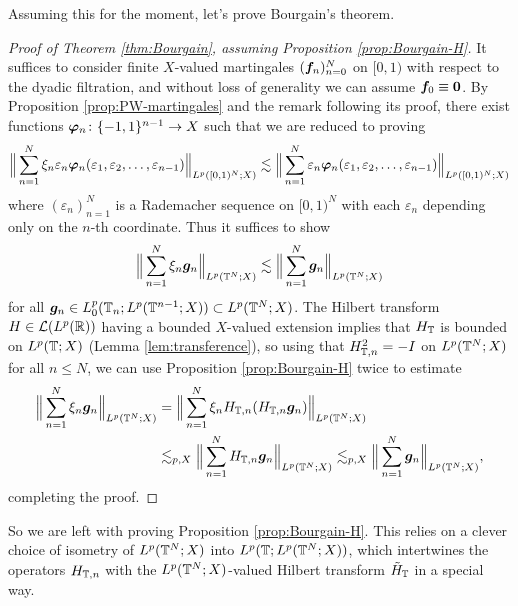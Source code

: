 Assuming this for the moment, let's prove Bourgain's theorem.
\begin{proof}[Proof of Theorem \ref{thm:Bourgain}, assuming Proposition \ref{prop:Bourgain-H}]
  It suffices to consider finite $X$-valued martingales $(\bm{f}_n)_{n=0}^{N}$ on $[0,1)$ with respect to the dyadic filtration, and without loss of generality we can assume $\bm{f}_{0} \equiv \bm{0}$.
  By Proposition \ref{prop:PW-martingales} and the remark following its proof, there exist functions $\bm{\varphi}_{n} \colon \{-1,1\}^{n-1} \rightarrow X$ such that we are reduced to proving
  \begin{equation*}
    \Big\| \sum_{n=1}^{N} \xi_{n} \varepsilon_{n} \bm{\varphi}_{n}(\varepsilon_{1}, \varepsilon_{2}, \ldots, \varepsilon_{n-1}) \Big\|_{L^p([0,1)^{N};X)} \lesssim \Big\| \sum_{n=1}^{N} \varepsilon_{n} \bm{\varphi}_{n}(\varepsilon_{1}, \varepsilon_{2}, \ldots, \varepsilon_{n-1}) \Big\|_{L^p([0,1)^{N};X)}
  \end{equation*}
  where $(\varepsilon_{n})_{n=1}^{N}$ is a Rademacher sequence on $[0,1)^{N}$ with each $\varepsilon_{n}$ depending only on the $n$-th coordinate.
  Thus it suffices to show
  \begin{equation*}
    \Big\| \sum_{n=1}^{N} \xi_{n} \bm{g}_{n} \Big\|_{L^p(\mathbb{T}^{N};X)} \lesssim \Big\| \sum_{n=1}^{N} \bm{g}_{n} \Big\|_{L^p(\mathbb{T}^{N};X)}
  \end{equation*}
  for all $\bm{g}_{n} \in L_{0}^p(\mathbb{T}_{n};L^{p}(\mathbb{T}^{n-1};X)) \subset L^p(\mathbb{T}^{N};X)$.
  The Hilbert transform $H \in \mathcal{L}(L^p(\mathbb{R}))$ having a bounded $X$-valued extension implies that $H_{\mathbb{T}}$ is bounded on $L^p(\mathbb{T};X)$ (Lemma \ref{lem:transference}), so using that $H_{\mathbb{T},n}^{2} = -I$ on $L^p(\mathbb{T}^{N};X)$ for all $n \leq N$, we can use Proposition \ref{prop:Bourgain-H} twice to estimate
  \begin{equation*}
    \begin{aligned}
      \Big\| \sum_{n=1}^{N} \xi_{n} \bm{g}_{n} \Big\|_{L^p(\mathbb{T}^{N};X)}
      &= \Big\| \sum_{n=1}^{N} \xi_{n} H_{\mathbb{T},n} (H_{\mathbb{T},n} \bm{g}_{n}) \Big\|_{L^p(\mathbb{T}^{N};X)} \\
      &\lesssim_{p,X}  \Big\| \sum_{n=1}^{N} H_{\mathbb{T},n} \bm{g}_{n} \Big\|_{L^p(\mathbb{T}^{N};X)} 
      \lesssim_{p,X}  \Big\| \sum_{n=1}^{N} \bm{g}_{n} \Big\|_{L^p(\mathbb{T}^{N};X)},
    \end{aligned}
  \end{equation*}
  completing the proof.
\end{proof}

So we are left with proving Proposition \ref{prop:Bourgain-H}.
This relies on a clever choice of isometry of $L^p(\mathbb{T}^{N};X)$ into $L^p(\mathbb{T}; L^p(\mathbb{T}^{N};X))$, which intertwines the operators $H_{\mathbb{T},n}$ with the $L^p(\mathbb{T}^{N};X)$-valued Hilbert transform $\tilde{H}_{\mathbb{T}}$ in a special way.

